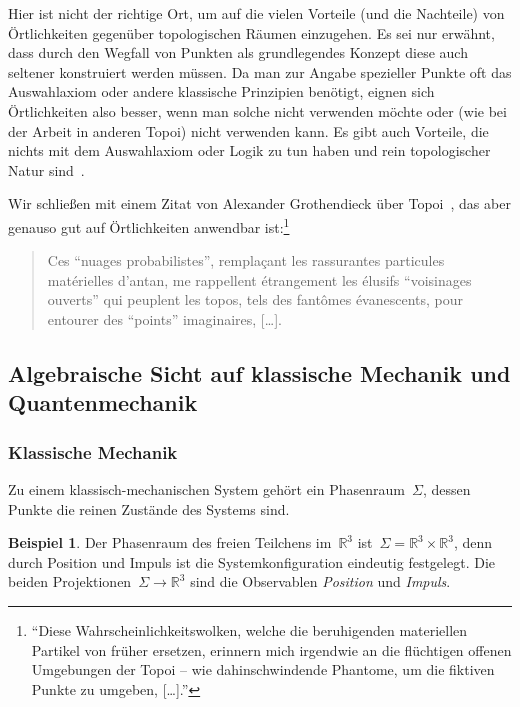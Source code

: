 \documentclass[a4paper,ngerman,12pt]{scrartcl}
\theoremstyle{definition}
\newtheorem{bsp}[defn]{Beispiel}
\theoremstyle{plain}
\theoremstyle{remark}
\newcommand{\RR}{\mathbb{R}}
\renewcommand{\_}{\mathpunct{.}\,}
\newcommand{\?}{\,{:}\,}
\begin{document}
Hier ist nicht der richtige Ort, um auf die vielen Vorteile (und die Nachteile) von
Örtlichkeiten gegenüber topologischen Räumen einzugehen. Es sei nur erwähnt,
dass durch den Wegfall von Punkten als grundlegendes Konzept diese auch
seltener konstruiert werden müssen. Da man zur Angabe spezieller Punkte oft das
Auswahlaxiom oder andere klassische Prinzipien benötigt, eignen sich
Örtlichkeiten also besser, wenn man solche nicht verwenden möchte oder (wie bei
der Arbeit in anderen Topoi) nicht verwenden kann. Es gibt auch Vorteile, die
nichts mit dem Auswahlaxiom oder Logik zu tun haben und rein topologischer
Natur sind~\cite{johnstone:art,johnstone:point}.

Wir schließen mit einem Zitat von Alexander Grothendieck über
Topoi~\cite{grothendieck:zitat}, das aber
genauso gut auf Örtlichkeiten anwendbar ist:\footnote{%
"`Diese \glq Wahrscheinlichkeitswolken\grq, welche die beruhigenden materiellen
Partikel von früher ersetzen, erinnern mich irgendwie an die flüchtigen
\glq offenen Umgebungen\grq{} der Topoi -- wie dahinschwindende Phantome, um
die fiktiven \glq Punkte\grq{} zu umgeben, [\ldots]."'}
\begin{quote}
Ces “nuages probabilistes”, remplaçant les rassurantes particules matérielles
d’antan, me rappellent étrangement les élusifs “voisinages ouverts” qui
peuplent les topos, tels des fantômes évanescents, pour entourer des “points”
imaginaires, [\ldots].
\end{quote}


\subsection{Algebraische Sicht auf klassische Mechanik und Quantenmechanik}

\subsubsection*{Klassische Mechanik}

Zu einem klassisch-mechanischen System gehört ein Phasenraum~$\Sigma$, dessen
Punkte die reinen Zustände des Systems sind.

\begin{bsp}Der Phasenraum des freien Teilchens im~$\RR^3$ ist~$\Sigma = \RR^3
\times \RR^3$, denn durch Position und Impuls ist die Systemkonfiguration
eindeutig festgelegt. Die beiden Projektionen~$\Sigma \to \RR^3$ sind die
Observablen \emph{Position} und \emph{Impuls}.\end{bsp}
\end{document}
